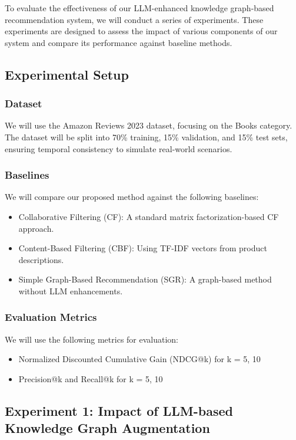 \documentclass{article}
\begin{document}
To evaluate the effectiveness of our LLM-enhanced knowledge graph-based recommendation system, we will conduct a series of experiments. These experiments are designed to assess the impact of various components of our system and compare its performance against baseline methods.

\subsection{Experimental Setup}

\subsubsection{Dataset}
We will use the Amazon Reviews 2023 dataset, focusing on the Books category. The dataset will be split into 70\% training, 15\% validation, and 15\% test sets, ensuring temporal consistency to simulate real-world scenarios.

\subsubsection{Baselines}
We will compare our proposed method against the following baselines:
\begin{itemize}
    \item Collaborative Filtering (CF): A standard matrix factorization-based CF approach.
    \item Content-Based Filtering (CBF): Using TF-IDF vectors from product descriptions.
    \item Simple Graph-Based Recommendation (SGR): A graph-based method without LLM enhancements.
\end{itemize}

\subsubsection{Evaluation Metrics}
We will use the following metrics for evaluation:
\begin{itemize}
    \item Normalized Discounted Cumulative Gain (NDCG@k) for k = 5, 10
    \item Precision@k and Recall@k for k = 5, 10
\end{itemize}

\subsection{Experiment 1: Impact of LLM-based Knowledge Graph Augmentation}
\end{document}
